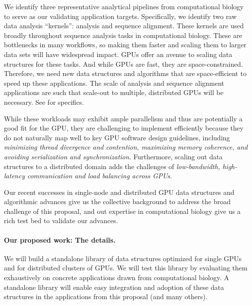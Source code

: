 
We identify three representative analytical pipelines from computational biology to serve as our validating application targets.
Specifically, we identify two raw data analysis ``kernels'':
\Kmer analysis and sequence alignment. These kernels are used broadly
throughout sequence analysis tasks in computational biology. These are bottlenecks in many
workflows, so making them faster and scaling them to larger data
sets will have widespread impact. GPUs offer an avenue to scaling data
structures for these tasks. And while GPUs are fast, they are space-constrained.  Therefore,
we need new data structures and algorithms that are space-efficient to speed up
these applications. The scale of \Kmer analysis and sequence alignment applications are such that scale-out to multiple, distributed GPUs will be necessary. See
 for specifics.

While these workloads may exhibit ample parallelism and thus are potentially a
good fit for the GPU, they are challenging to implement efficiently because
they do not naturally map well to key GPU software design guidelines, including
\emph{minimizing thread divergence and contention, maximizing memory coherence,
and avoiding serialization and synchronization}. Furthermore, scaling out data
structures to a distributed domain adds the challenges of \emph{low-bandwidth,
high-latency communication and load balancing across GPUs}.

Our recent successes in single-node and distributed GPU data structures and
algorithmic advances give us the
collective background to address the broad challenge of this proposal, and out expertise in computational biology give us a rich test bed to validate our advances.


\paragraph{Our proposed work: The details.}
We will build a standalone library of data structures optimized for single GPUs and for distributed clusters of GPUs.
We will test this library by evaluating them exhaustively on concrete applications drawn from computational biology. 
 A standalone library will enable easy integration and adoption of
these data structures in the applications from this proposal (and many others).


